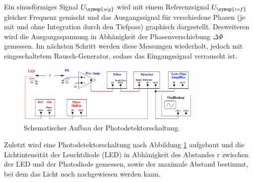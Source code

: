 Ein sinusförmiges Signal $U_\symup{sig}$ wird mit einem Referenzsignal
$U_\symup{ref}$ gleicher Frequenz gemischt und das Ausgangssignal für verschiedene
Phasen (je mit und ohne Integration durch den Tiefpass) graphisch dargestellt.
Desweiteren wird die Ausgangsspannung in Abhänigkeit der Phasenverschiebung
$\Delta\Phi$ gemessen.
Im nächsten Schritt werden diese Messungen wiederholt, jedoch mit eingeschaltetem
Rausch-Generator, sodass das Eingangssignal verrauscht ist.
\begin{figure}
  \centering
  \includegraphics[width=0.8\textwidth]{photodetektor.png}
  \caption{Schematischer Aufbau der Photodetektorschaltung.}
  \label{fig:photodetektor}
\end{figure}
Zuletzt wird eine Photodetektorschaltung nach Abbildung \ref{fig:photodetektor}
aufgebaut und die Lichtintensität der Leuchtdiode (LED) in Abhänigkeit des Abstandes
r zwischen der LED und der Photodiode gemessen, sowie der maximale Abstand bestimmt,
bei dem das Licht noch nachgewiesen werden kann.
